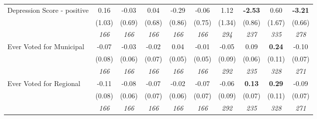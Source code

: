\begin{tabular}{l c c c c c c c c c}
Depression Score - positive & 0.16 & -0.03 & 0.04 & -0.29 & -0.06 & 1.12 & \textbf{-2.53} & 0.60 & \textbf{-3.21} \\
& (1.03) & (0.69) & (0.68) & (0.86) & (0.75) & (1.34) & (0.86) & (1.67) & (0.66) \\
& \textit{ 166 } & \textit{ 166 } & \textit{ 166 } & \textit{ 166 } & \textit{ 166 } & \textit{ 294 } & \textit{ 237 } & \textit{ 335 } & \textit{ 278 } \\
Ever Voted for Municipal & -0.07 & -0.03 & -0.02 & 0.04 & -0.01 & -0.05 & 0.09 & \textbf{ 0.24 } & -0.10 \\
& (0.08) & (0.06) & (0.07) & (0.05) & (0.05) & (0.09) & (0.06) & (0.11) & (0.07) \\
& \textit{ 166 } & \textit{ 166 } & \textit{ 166 } & \textit{ 166 } & \textit{ 166 } & \textit{ 292 } & \textit{ 235 } & \textit{ 328 } & \textit{ 271 } \\
Ever Voted for Regional & -0.11 & -0.08 & -0.07 & -0.02 & -0.07 & -0.06 & \textbf{0.13} & \textbf{ 0.29 } & -0.09 \\
& (0.08) & (0.06) & (0.07) & (0.06) & (0.07) & (0.09) & (0.07) & (0.11) & (0.07) \\
& \textit{ 166 } & \textit{ 166 } & \textit{ 166 } & \textit{ 166 } & \textit{ 166 } & \textit{ 292 } & \textit{ 235 } & \textit{ 328 } & \textit{ 271 } \\
\bottomrule
\end{tabular}
